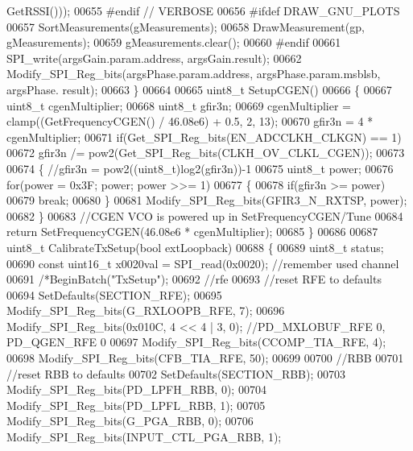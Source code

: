 \begin{DoxyCode}
{{{{{{{{{{{{{{{{      GetRSSI()));
00655 \textcolor{preprocessor}{#endif // VERBOSE}
00656 \textcolor{preprocessor}{#ifdef DRAW\_GNU\_PLOTS}
00657     SortMeasurements(gMeasurements);
00658     DrawMeasurement(gp, gMeasurements);
00659     gMeasurements.clear();
00660 \textcolor{preprocessor}{#endif}
00661     SPI_write(argsGain.param.address, argsGain.result);
00662     Modify_SPI_Reg_bits(argsPhase.param.address, argsPhase.param.msblsb, argsPhase.
      result);
00663 \}
00664 
00665 uint8\_t SetupCGEN()
00666 \{
00667     uint8\_t cgenMultiplier;
00668     uint8\_t gfir3n;
00669     cgenMultiplier = clamp((GetFrequencyCGEN() / 46.08e6) + 0.5, 2, 13);
00670     gfir3n = 4 * cgenMultiplier;
00671     \textcolor{keywordflow}{if}(Get_SPI_Reg_bits(EN_ADCCLKH_CLKGN) == 1)
00672         gfir3n /= pow2(Get_SPI_Reg_bits(CLKH_OV_CLKL_CGEN));
00673 
00674     \{ \textcolor{comment}{//gfir3n = pow2((uint8\_t)log2(gfir3n))-1}
00675         uint8\_t power;
00676         \textcolor{keywordflow}{for}(power = 0x3F; power; power >>= 1)
00677         \{
00678             \textcolor{keywordflow}{if}(gfir3n >= power)
00679                 \textcolor{keywordflow}{break};
00680         \}
00681         Modify_SPI_Reg_bits(GFIR3_N_RXTSP, power);
00682     \}
00683     \textcolor{comment}{//CGEN VCO is powered up in SetFrequencyCGEN/Tune}
00684     \textcolor{keywordflow}{return} SetFrequencyCGEN(46.08e6 * cgenMultiplier);
00685 \}
00686 
00687 uint8\_t CalibrateTxSetup(\textcolor{keywordtype}{bool} extLoopback)
00688 \{
00689     uint8\_t status;
00690     \textcolor{keyword}{const} uint16\_t x0020val = SPI_read(0x0020); \textcolor{comment}{//remember used channel}
00691     \textcolor{comment}{/*BeginBatch("TxSetup");}
00692 \textcolor{comment}{    //rfe}
00693 \textcolor{comment}{    //reset RFE to defaults}
00694 \textcolor{comment}{    SetDefaults(SECTION\_RFE);}
00695 \textcolor{comment}{    Modify\_SPI\_Reg\_bits(G\_RXLOOPB\_RFE, 7);}
00696 \textcolor{comment}{    Modify\_SPI\_Reg\_bits(0x010C, 4 << 4 | 3, 0); //PD\_MXLOBUF\_RFE 0, PD\_QGEN\_RFE 0}
00697 \textcolor{comment}{    Modify\_SPI\_Reg\_bits(CCOMP\_TIA\_RFE, 4);}
00698 \textcolor{comment}{    Modify\_SPI\_Reg\_bits(CFB\_TIA\_RFE, 50);}
00699 \textcolor{comment}{}
00700 \textcolor{comment}{    //RBB}
00701 \textcolor{comment}{    //reset RBB to defaults}
00702 \textcolor{comment}{    SetDefaults(SECTION\_RBB);}
00703 \textcolor{comment}{    Modify\_SPI\_Reg\_bits(PD\_LPFH\_RBB, 0);}
00704 \textcolor{comment}{    Modify\_SPI\_Reg\_bits(PD\_LPFL\_RBB, 1);}
00705 \textcolor{comment}{    Modify\_SPI\_Reg\_bits(G\_PGA\_RBB, 0);}
00706 \textcolor{comment}{    Modify\_SPI\_Reg\_bits(INPUT\_CTL\_PGA\_RBB, 1);}
}}}}}}}}}}}}}}}}
\end{DoxyCode}
